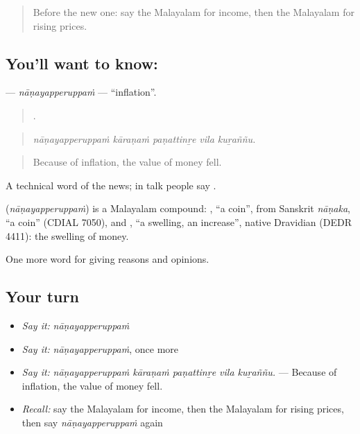 \label{lesson:ML-C428-nanayapperuppam}



\begin{quote}
Before the new one: say the Malayalam for income, then the Malayalam for rising prices.
\end{quote}

\subsection*{You'll want to know: }
\textbf{} — \emph{nāṇayapperuppaṁ} — \textquotedblleft{}inflation\textquotedblright{}.

\begin{quote}
    .
\end{quote}

\begin{quote}
\emph{nāṇayapperuppaṁ kāraṇaṁ paṇattinṟe vila kuṟaññu.}
\end{quote}

\begin{quote}
Because of inflation, the value of money fell.
\end{quote}

A technical word of the news; in talk people say .

\begin{cousinweb}
\textbf{} (\emph{nāṇayapperuppaṁ}) is a Malayalam compound: , \textquotedblleft{}a coin\textquotedblright{}, from Sanskrit \emph{nāṇaka}, \textquotedblleft{}a coin\textquotedblright{} (CDIAL 7050), and , \textquotedblleft{}a swelling, an increase\textquotedblright{}, native Dravidian (DEDR 4411): the swelling of money.
\end{cousinweb}

\begin{grammarlens}[title={What you've built}]
One more word for giving reasons and opinions.
\end{grammarlens}

\subsection*{Your turn}
\begin{itemize}
\raggedright
  \item \emph{Say it:} \emph{nāṇayapperuppaṁ}
  \item \emph{Say it:} \emph{nāṇayapperuppaṁ}, once more
  \item \emph{Say it:} \emph{nāṇayapperuppaṁ kāraṇaṁ paṇattinṟe vila kuṟaññu.} — Because of inflation, the value of money fell.
  \item \emph{Recall:} say the Malayalam for income, then the Malayalam for rising prices, then say \emph{nāṇayapperuppaṁ} again
\end{itemize}

